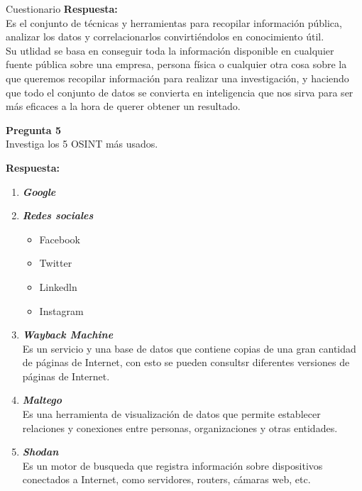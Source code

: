 \documentclass{article}
\newenvironment{problem}[2][Pregunta]
    { \begin{mdframed}[backgroundcolor=gray!20] \textbf{#1 #2} \\}
    {  \end{mdframed}}
\newenvironment{solution}
    {\textbf{Respuesta:\\}}
    {}
\begin{document}
\begin{section}{Cuestionario}
\begin{solution}
Es el conjunto de técnicas y herramientas para recopilar información pública, analizar los datos y correlacionarlos convirtiéndolos en conocimiento útil.\\

Su utlidad se basa en conseguir toda la información disponible en cualquier fuente pública sobre una empresa, persona física o cualquier otra cosa sobre la que queremos recopilar información para realizar una investigación, y haciendo que todo el conjunto de datos se convierta en inteligencia que nos sirva para ser más eficaces a la hora de querer obtener un resultado.
\end{solution}
\begin{problem}
    {5} Investiga los 5 OSINT más usados.
\end{problem}

\begin{solution}
    \begin{enumerate}
        \item \textbf{\textit{Google}}
        \item \textbf{\textit{Redes sociales}}
        \begin{itemize}
            \item Facebook
            \item Twitter
            \item Linkedln
            \item Instagram
        \end{itemize}
        \item \textbf{\textit{Wayback Machine}}\\
         Es un servicio y una base de datos que contiene copias de una gran cantidad de páginas de Internet, con esto se pueden consultsr diferentes versiones de páginas de Internet.

         \item \textbf{\textit{Maltego}}\\
         Es una herramienta de visualización de datos que permite establecer relaciones y conexiones entre personas, organizaciones y otras entidades.

         \item \textbf{\textit{Shodan}}\\
         Es un motor de busqueda que registra información sobre dispositivos conectados a Internet, como servidores, routers, cámaras web, etc.
    \end{enumerate}
\end{solution}


\end{section}
\end{document}
